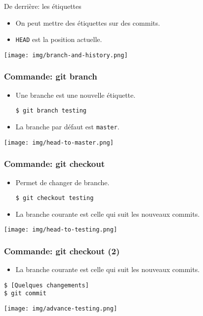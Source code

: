 \documentclass{beamer}
\begin{document}
\begin{frame}{De derrière: les étiquettes}
    \begin{itemize}
        \item On peut mettre des étiquettes sur des commits.
        \item \texttt{HEAD} est la position actuelle.
    \end{itemize}
    \texttt{[image: img/branch-and-history.png]}
\end{frame}

\begin{frame}[fragile]
    \frametitle{Commande: git branch}
    \begin{itemize}
        \item Une branche est une nouvelle étiquette.
\begin{lstlisting}
$ git branch testing
\end{lstlisting}
        \item La branche par défaut est \texttt{master}.
    \end{itemize}
    \begin{center}
        \texttt{[image: img/head-to-master.png]}
    \end{center}
\end{frame}

\begin{frame}[fragile]
    \frametitle{Commande: git checkout}
    \begin{itemize}
        \item Permet de changer de branche.
\begin{lstlisting}
$ git checkout testing
\end{lstlisting}
        \item La branche courante est celle qui suit les nouveaux commits.
    \end{itemize}
    \begin{center}
        \texttt{[image: img/head-to-testing.png]}
    \end{center}
\end{frame}

\begin{frame}[fragile]
    \frametitle{Commande: git checkout (2)}
    \begin{itemize}
        \item La branche courante est celle qui suit les nouveaux commits.
    \end{itemize}
\begin{lstlisting}
$ [Quelques changements]
$ git commit
\end{lstlisting}

    \begin{center}
        \texttt{[image: img/advance-testing.png]}
    \end{center}
\end{frame}
\end{document}
